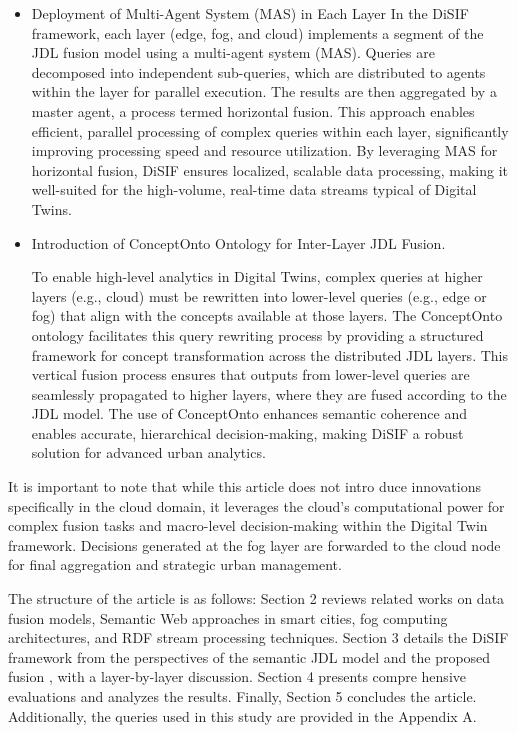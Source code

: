 \documentclass[5p,times]{elsarticle}
\begin{document}
\begin{itemize}
  \item Deployment of Multi-Agent System (MAS) in Each Layer
  In the DiSIF framework, each layer (edge, fog, and cloud) implements a segment of the
   JDL fusion model using a multi-agent system (MAS). Queries are decomposed into
    independent sub-queries, which are distributed to agents within the layer 
    for parallel execution. The results are then aggregated by a master agent,
     a process termed horizontal fusion. This approach enables efficient, 
     parallel processing of complex queries within each layer, significantly
      improving processing speed and resource utilization. By leveraging MAS 
      for horizontal fusion, DiSIF ensures localized, scalable data processing,
       making it well-suited for the high-volume, real-time data streams typical of Digital Twins.

  \item Introduction of ConceptOnto Ontology for Inter-Layer JDL Fusion.
  
  To enable high-level analytics in Digital Twins, complex queries at higher layers
   (e.g., cloud) must be rewritten into lower-level queries (e.g., edge or fog) 
   that align with the concepts available at those layers. The ConceptOnto ontology
    facilitates this query rewriting process by providing a structured framework for
     concept transformation across the distributed JDL layers. This vertical fusion 
     process ensures that outputs from lower-level queries are seamlessly propagated to
      higher layers, where they are fused according to the JDL model. The use of
       ConceptOnto enhances semantic coherence and enables accurate, hierarchical
        decision-making, making DiSIF a robust solution for advanced urban analytics.

 \end{itemize}


 It is important to note that while this article does not intro
 duce innovations specifically in the cloud domain, it leverages
  the cloud’s computational power for complex fusion tasks and
  macro-level decision-making within the Digital Twin framework.
  Decisions generated at the fog layer are forwarded to the cloud
  node for final aggregation and strategic urban management.


  The structure of the article is as follows: Section 2 reviews related
 works on data fusion models, Semantic Web approaches in smart
 cities, fog computing architectures, and RDF stream processing
 techniques. Section 3 details the DiSIF framework from the
 perspectives of the semantic JDL model and the proposed fusion
 , with a layer-by-layer discussion. Section 4 presents compre
hensive evaluations and analyzes the results. Finally, Section 5
 concludes the article. Additionally, the queries used in this study
 are provided in the Appendix A.
\end{document}
